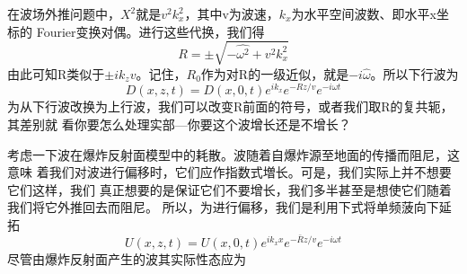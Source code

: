 在波场外推问题中，$X^2$就是$v^2k_x^2$，其中v为波速，$k_x$为水平空间波数、即水平x坐标的
Fourier变换对偶。进行这些代换，我们得
\begin{equation}
R=\pm \sqrt{-\hat{\omega^2}+v^2k_x^2}
\label{eq:ex4.6.32}
\end{equation}
由此可知R类似于$\pm ik_zv$。记住，$R_0$作为对R的一级近似，就是$-i\hat{\omega}$。所以下行波为
\begin{equation}
D(x,z,t)=D(x,0,t)e^{ik_x}e^{-Rz/v}e^{-i\omega t}
\label{eq:ex4.6.33}
\end{equation}
为从下行波改换为上行波，我们可以改变R前面的符号，或者我们取R的复共轭，其差别就
看你要怎么处理实部---你要这个波增长还是不增长？

考虑一下波在爆炸反射面模型中的耗散。波随着自爆炸源至地面的传播而阻尼，这意味
着我们对波进行偏移时，它们应作指数式増长。可是，我们实际上并不想要它们这样，我们
真正想要的是保证它们不要增长，我们多半甚至是想使它们随着我们将它外推回去而阻尼。
所以，为进行偏移，我们是利用下式将单频菠向下延拓
\begin{equation}
U(x,z,t)=U(x,0,t)e^{ik_xx}e^{-\bar{R}z/v}e^{-i\omega t}
\label{eq:ex4.6.34}
\end{equation}
尽管由爆炸反射面产生的波其实际性态应为